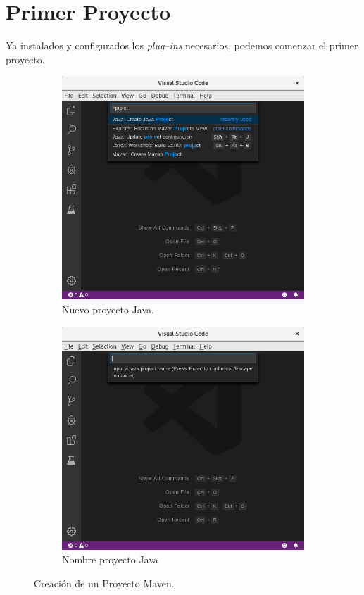 \documentclass[a5paper,10pt]{article}
\begin{document}



\section{Primer Proyecto}
\label{primerproyecto}

Ya instalados y configurados los \emph{plug--ins} necesarios, podemos comenzar el primer proyecto.

\begin{figure}[t]
	\centering
	\begin{subfigure}[b]{.95\textwidth}
		\centering
		\includegraphics[width=.85\textwidth]{NuevoProyecto}
		\caption{Nuevo proyecto Java.}
		\label{maven_nuevo}
	\end{subfigure}
	\begin{subfigure}[b]{.95\textwidth}
		\centering
		\includegraphics[width=.85\textwidth]{NombreProyecto}
		\caption{Nombre proyecto Java}
		\label{maven_nombre}
	\end{subfigure}
	\caption{Creación de un Proyecto Maven.}
	\label{maven}
\end{figure}
\end{document}

